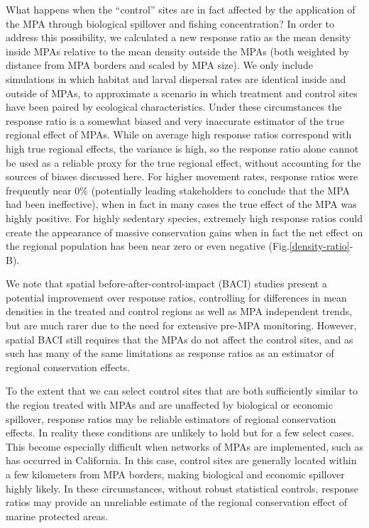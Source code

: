 \documentclass[9pt,twocolumn,twoside,lineno]{pnas-new}
\begin{document}
What happens when the ``control'' sites are in fact affected by the
application of the MPA through biological spillover and fishing
concentration? In order to address this possibility, we calculated a new
response ratio as the mean density inside MPAs relative to the mean
density outside the MPAs (both weighted by distance from MPA borders and
scaled by MPA size). We only include simulations in which habitat and
larval dispersal rates are identical inside and outside of MPAs, to
approximate a scenario in which treatment and control sites have been
paired by ecological characteristics. Under these circumstances the
response ratio is a somewhat biased and very inaccurate estimator of the
true regional effect of MPAs. While on average high response ratios
correspond with high true regional effects, the variance is high, so the
response ratio alone cannot be used as a reliable proxy for the true
regional effect, without accounting for the sources of biases discussed
here. For higher movement rates, response ratios were frequently near
0\% (potentially leading stakeholders to conclude that the MPA had been
ineffective), when in fact in many cases the true effect of the MPA was
highly positive. For highly sedentary species, extremely high response
ratios could create the appearance of massive conservation gains when in
fact the net effect on the regional population has been near zero or
even negative (Fig.\ref{density-ratio}-B).

We note that spatial before-after-control-impact (BACI) studies present
a potential improvement over response ratios, controlling for
differences in mean densities in the treated and control regions as well
as MPA independent trends, but are much rarer due to the need for
extensive pre-MPA monitoring. However, spatial BACI still requires that
the MPAs do not affect the control sites, and as such has many of the
same limitations as response ratios as an estimator of regional
conservation effects.

To the extent that we can select control sites that are both
sufficiently similar to the region treated with MPAs and are unaffected
by biological or economic spillover, response ratios may be reliable
estimators of regional conservation effects. In reality these conditions
are unlikely to hold but for a few select cases. This become especially
difficult when networks of MPAs are implemented, such as has occurred in
California. In this case, control sites are generally located within a
few kilometers from MPA borders, making biological and economic
spillover highly likely. In these circumstances, without robust
statistical controls, response ratios may provide an unreliable estimate
of the regional conservation effect of marine protected areas.
\end{document}

